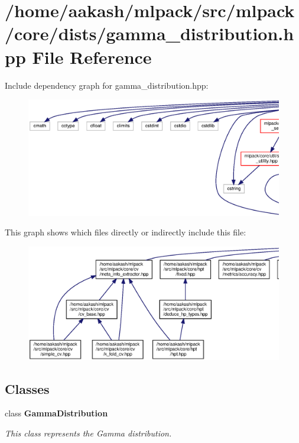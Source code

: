 \section{/home/aakash/mlpack/src/mlpack/core/dists/gamma\+\_\+distribution.hpp File Reference}
\label{gamma__distribution_8hpp}
Include dependency graph for gamma\+\_\+distribution.\+hpp\+:
\nopagebreak
\begin{figure}[H]
\begin{center}
\leavevmode
\includegraphics[width=350pt]{gamma__distribution_8hpp__incl}
\end{center}
\end{figure}
This graph shows which files directly or indirectly include this file\+:
\nopagebreak
\begin{figure}[H]
\begin{center}
\leavevmode
\includegraphics[width=350pt]{gamma__distribution_8hpp__dep__incl}
\end{center}
\end{figure}
\subsection*{Classes}
\begin{DoxyCompactItemize}
\item 
class \textbf{ Gamma\+Distribution}
\begin{DoxyCompactList}\small\item\em This class represents the Gamma distribution. \end{DoxyCompactList}\end{DoxyCompactItemize}
